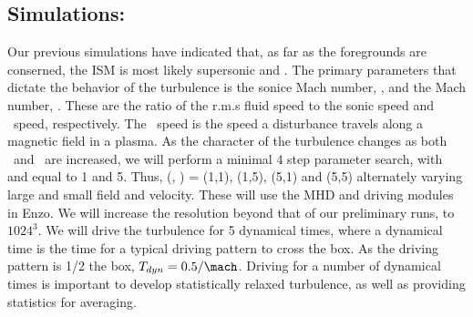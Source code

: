 \subsection{Simulations: \nameCMB}
\label{subsec.cmb_sims}

Our previous simulations have indicated that, as far as the foregrounds are
conserned, the ISM is most likely supersonic and \sa.  The primary parameters
that dictate the behavior of the turbulence is the sonice Mach number, \mach,
and the \alf Mach number, \alfmach.  These are the ratio of the r.m.s fluid
speed to the sonic speed and \alf\ speed, respectively.  The \alf\ speed is the
speed a disturbance travels along a magnetic field in a plasma.  As the
character of the turbulence changes as both \mach\ and \alfmach\ are increased,
we will perform a minimal 4 step parameter search, with \mach and \alfmach equal
to 1 and 5.  Thus, (\mach, \alfmach) = (1,1), (1,5), (5,1) and (5,5) alternately
varying large and small field and velocity.  These will use the MHD and driving
modules in Enzo.  We will increase the resolution beyond that of our preliminary
runs, to $1024^3$.  We will drive the turbulence for 5 dynamical times, where a
dynamical time is the time for a typical driving pattern to cross the box.  As
the driving pattern is 1/2 the box, $T_{dyn}=0.5/\mach$.  Driving for a number
of dynamical times is important to develop statistically relaxed turbulence, as
well as providing statistics for averaging.  
